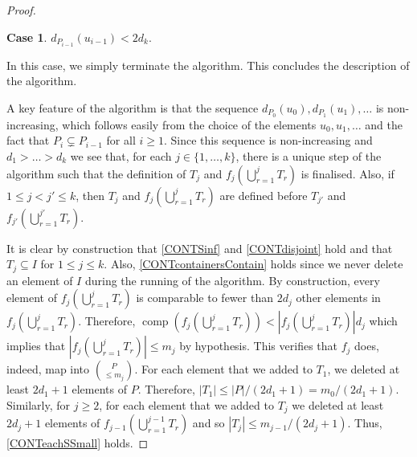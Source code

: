 \documentclass[11 pt]{article}
\theoremstyle{definition}
\theoremstyle{case}
\newtheorem{case}{Case}
\numberwithin{equation}{section}
\DeclareMathOperator{\comp}{comp}
\begin{document}
\begin{proof}
\begin{case}
\label{smalldegcase}
$d_{P_{i-1}}\left(u_{i-1}\right) < 2d_k$.
\end{case}

In this case, we simply terminate the algorithm. This concludes the description of the algorithm. 

A key feature of the algorithm is that the sequence $d_{P_0}(u_0),d_{P_1}(u_1),\dots$ is non-increasing, which follows easily from the choice of the elements $u_0,u_1,\dots$ and the fact that $P_{i}\subsetneq P_{i-1}$ for all $i\geq1$. Since this sequence is non-increasing and $d_1>\dots>d_k$ we see that, for each $j\in\{1,\dots,k\}$, there is a unique step of the algorithm such that the definition of $T_j$ and $f_j\left(\bigcup_{r=1}^j T_r\right)$ is finalised. Also, if $1\leq j < j' \leq k$, then $T_j$ and $f_j\left(\bigcup_{r=1}^j T_r\right)$ are defined before $T_{j'}$ and $f_{j'}\left(\bigcup_{r=1}^{j'}T_r\right)$.


It is clear by construction that \eqref{CONTSinf} and \eqref{CONTdisjoint} hold and that $T_j\subseteq I$ for $1\leq j\leq k$. Also, \eqref{CONTcontainersContain} holds since we never delete an element of $I$ during the running of the algorithm. By construction, every element of $f_j\left(\bigcup_{r=1}^jT_r\right)$ is comparable to fewer than $2d_j$ other elements in $f_j\left(\bigcup_{r=1}^jT_r\right)$. Therefore, $\comp\left(f_j\left(\bigcup_{r=1}^jT_r\right)\right)< \left|f_j\left(\bigcup_{r=1}^jT_r\right)\right|d_j$ which implies that $\left|f_j\left(\bigcup_{r=1}^jT_r\right)\right|\leq m_j$ by hypothesis. This verifies that $f_j$ does, indeed, map into $\binom{P}{\leq m_j}$. For each element that we added to $T_1$, we deleted at least $2d_1+1$ elements of $P$. Therefore, $|T_1|\leq |P|/(2d_1+1) = m_{0}/(2d_1+1)$. Similarly, for $j\geq2$, for each element that we added to $T_j$ we deleted at least $2d_j+1$ elements of $f_{j-1}\left(\bigcup_{r=1}^{j-1}T_r\right)$ and so  $|T_j|\leq m_{j-1}/(2d_j+1)$. Thus, \eqref{CONTeachSSmall} holds. 


\end{proof}
\end{document}
